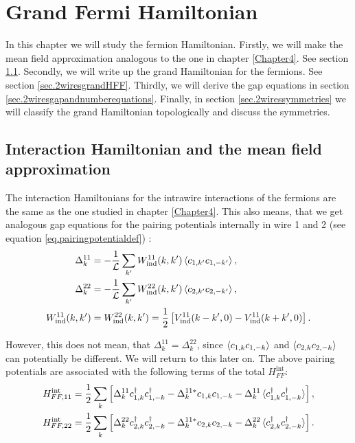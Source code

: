 
\chapter{Grand Fermi Hamiltonian} %

\label{Chapter9} %


In this chapter we will study the fermion Hamiltonian. Firstly, we will make the mean field approximation analogous to the one in chapter \ref{Chapter4}. See section \ref{sec.2wiresmeanfieldapproximation}. Secondly, we will write up the grand Hamiltonian for the fermions. See section \ref{sec.2wiresgrandHFF}. Thirdly, we will derive the gap equations in section \ref{sec.2wiresgapandnumberequations}. Finally, in section \ref{sec.2wiressymmetries} we will classify the grand Hamiltonian topologically and discuss the symmetries. 

\section{Interaction Hamiltonian and the mean field approximation}
\label{sec.2wiresmeanfieldapproximation}
The interaction Hamiltonians for the intrawire interactions of the fermions are the same as the one studied in chapter \ref{Chapter4}. This also means, that we get analogous gap equations for the pairing potentials internally in wire 1 and 2 (see equation \ref{eq.pairingpotentialdef}) :
\begin{align}
\Delta^{11}_k &= -\frac{1}{\mathcal{L}} \sum_{k'} W_{\text{ind}}^{11}(k,k')\braket{c_{1,k'}c_{1,-k'}}, \nonumber \\
\Delta^{22}_k &= -\frac{1}{\mathcal{L}} \sum_{k'} W_{\text{ind}}^{22}(k,k')\braket{c_{2,k'}c_{2,-k'}}, \nonumber \\
W_{\text{ind}}^{11}(k,k') &= W_{\text{ind}}^{22}(k,k') = \frac{1}{2}\left[V_{\text{ind}}^{11}(k-k',0) - V_{\text{ind}}^{11}(k+k',0) \right].
\label{eq.pairingpotentialsintrawire}
\end{align}

However, this does not mean, that $\Delta^{11}_k = \Delta^{22}_k$, since $\braket{c_{1,k}c_{1,-k}}$ and $\braket{c_{2,k}c_{2,-k}}$ can potentially be different. We will return to this later on. The above pairing potentials are associated with the following terms of the total $H^\text{int}_{FF}$:
\begin{align}
H^\text{int}_{FF,11} &= \frac{1}{2}\sum_k \left[\Delta^{11}_k c^\dagger_{1,k}c^\dagger_{1,-k} - \Delta^{11 *}_k c_{1,k}c_{1,-k} - \Delta^{11}_k\braket{c^\dagger_{1,k}c^\dagger_{1,-k}} \right], \nonumber \\
H^\text{int}_{FF,22} &= \frac{1}{2}\sum_k \left[\Delta^{22}_k c^\dagger_{2,k}c^\dagger_{2,-k} - \Delta^{11 *}_k c_{2,k}c_{2,-k} - \Delta^{22}_k\braket{c^\dagger_{2,k}c^\dagger_{2,-k}} \right].
\label{eq.Hintintrawire}
\end{align}

